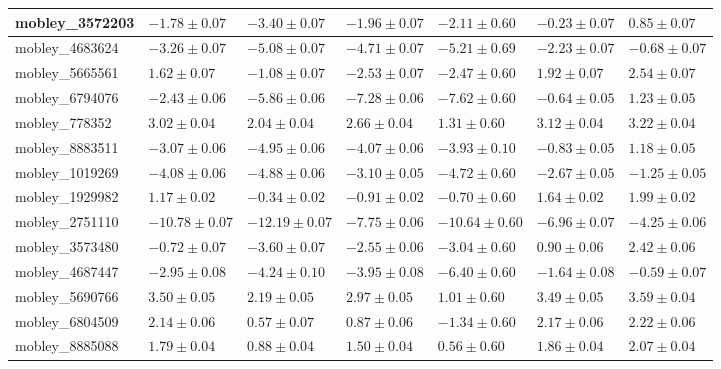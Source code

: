 \documentclass{article}
\begin{document}
\begin{landscape}
\begin{longtable}{|l{3.0cm}|l{3.0cm}|l{3.2cm}|l{3.6cm}|l{3.0cm}|l{3.0cm}|l{3.0cm}|}
mobley\_3572203	&	$	-1.78	\pm	0.07	$	&	$	-3.40	\pm	0.07	$	&	$	-1.96	\pm	0.07	$	&	$	-2.11	\pm	0.60	$	&	$	-0.23	\pm	0.07	$	&	$	0.85	\pm	0.07	$	\\ \hline
mobley\_4683624	&	$	-3.26	\pm	0.07	$	&	$	-5.08	\pm	0.07	$	&	$	-4.71	\pm	0.07	$	&	$	-5.21	\pm	0.69	$	&	$	-2.23	\pm	0.07	$	&	$	-0.68	\pm	0.07	$	\\ \hline
mobley\_5665561	&	$	1.62	\pm	0.07	$	&	$	-1.08	\pm	0.07	$	&	$	-2.53	\pm	0.07	$	&	$	-2.47	\pm	0.60	$	&	$	1.92	\pm	0.07	$	&	$	2.54	\pm	0.07	$	\\ \hline
mobley\_6794076	&	$	-2.43	\pm	0.06	$	&	$	-5.86	\pm	0.06	$	&	$	-7.28	\pm	0.06	$	&	$	-7.62	\pm	0.60	$	&	$	-0.64	\pm	0.05	$	&	$	1.23	\pm	0.05	$	\\ \hline
mobley\_778352	&	$	3.02	\pm	0.04	$	&	$	2.04	\pm	0.04	$	&	$	2.66	\pm	0.04	$	&	$	1.31	\pm	0.60	$	&	$	3.12	\pm	0.04	$	&	$	3.22	\pm	0.04	$	\\ \hline
mobley\_8883511	&	$	-3.07	\pm	0.06	$	&	$	-4.95	\pm	0.06	$	&	$	-4.07	\pm	0.06	$	&	$	-3.93	\pm	0.10	$	&	$	-0.83	\pm	0.05	$	&	$	1.18	\pm	0.05	$	\\ \hline
mobley\_1019269	&	$	-4.08	\pm	0.06	$	&	$	-4.88	\pm	0.06	$	&	$	-3.10	\pm	0.05	$	&	$	-4.72	\pm	0.60	$	&	$	-2.67	\pm	0.05	$	&	$	-1.25	\pm	0.05	$	\\ \hline
mobley\_1929982	&	$	1.17	\pm	0.02	$	&	$	-0.34	\pm	0.02	$	&	$	-0.91	\pm	0.02	$	&	$	-0.70	\pm	0.60	$	&	$	1.64	\pm	0.02	$	&	$	1.99	\pm	0.02	$	\\ \hline
mobley\_2751110	&	$	-10.78	\pm	0.07	$	&	$	-12.19	\pm	0.07	$	&	$	-7.75	\pm	0.06	$	&	$	-10.64	\pm	0.60	$	&	$	-6.96	\pm	0.07	$	&	$	-4.25	\pm	0.06	$	\\ \hline
mobley\_3573480	&	$	-0.72	\pm	0.07	$	&	$	-3.60	\pm	0.07	$	&	$	-2.55	\pm	0.06	$	&	$	-3.04	\pm	0.60	$	&	$	0.90	\pm	0.06	$	&	$	2.42	\pm	0.06	$	\\ \hline
mobley\_4687447	&	$	-2.95	\pm	0.08	$	&	$	-4.24	\pm	0.10	$	&	$	-3.95	\pm	0.08	$	&	$	-6.40	\pm	0.60	$	&	$	-1.64	\pm	0.08	$	&	$	-0.59	\pm	0.07	$	\\ \hline
mobley\_5690766	&	$	3.50	\pm	0.05	$	&	$	2.19	\pm	0.05	$	&	$	2.97	\pm	0.05	$	&	$	1.01	\pm	0.60	$	&	$	3.49	\pm	0.05	$	&	$	3.59	\pm	0.04	$	\\ \hline
mobley\_6804509	&	$	2.14	\pm	0.06	$	&	$	0.57	\pm	0.07	$	&	$	0.87	\pm	0.06	$	&	$	-1.34	\pm	0.60	$	&	$	2.17	\pm	0.06	$	&	$	2.22	\pm	0.06	$	\\ \hline
mobley\_8885088	&	$	1.79	\pm	0.04	$	&	$	0.88	\pm	0.04	$	&	$	1.50	\pm	0.04	$	&	$	0.56	\pm	0.60	$	&	$	1.86	\pm	0.04	$	&	$	2.07	\pm	0.04	$	\\ \hline

\end{longtable}
\end{landscape}
\end{document}
